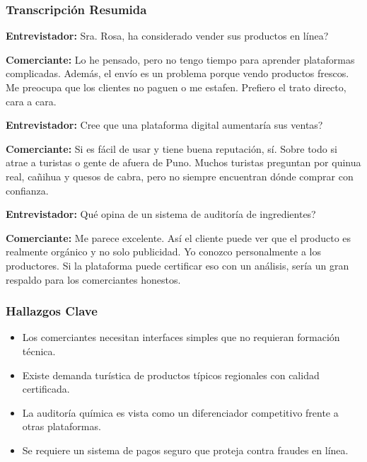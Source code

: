 \documentclass[12pt,a4paper]{article}
\begin{document}
\subsubsection{Transcripci\'on Resumida}

\textbf{Entrevistador:} Sra. Rosa, \textquestiondown ha considerado vender sus productos en l\'inea?

\textbf{Comerciante:} Lo he pensado, pero no tengo tiempo para aprender plataformas
complicadas. Adem\'as, el env\'io es un problema porque vendo productos frescos. Me
preocupa que los clientes no paguen o me estafen. Prefiero el trato directo,
cara a cara.

\textbf{Entrevistador:} \textquestiondown Cree que una plataforma digital aumentar\'ia sus ventas?

\textbf{Comerciante:} Si es f\'acil de usar y tiene buena reputaci\'on, s\'i. Sobre todo si
atrae a turistas o gente de afuera de Puno. Muchos turistas preguntan por quinua
real, ca\~nihua y quesos de cabra, pero no siempre encuentran d\'onde comprar con
confianza.

\textbf{Entrevistador:} \textquestiondown Qu\'e opina de un sistema de auditor\'ia de ingredientes?

\textbf{Comerciante:} Me parece excelente. As\'i el cliente puede ver que el producto es
realmente org\'anico y no solo publicidad. Yo conozco personalmente a los
productores. Si la plataforma puede certificar eso con un an\'alisis, ser\'ia un gran
respaldo para los comerciantes honestos.

\subsubsection{Hallazgos Clave}

\begin{itemize}[leftmargin=1.5cm]
  \item Los comerciantes necesitan interfaces simples que no requieran formaci\'on t\'ecnica.
  \item Existe demanda tur\'istica de productos t\'ipicos regionales con calidad certificada.
  \item La auditor\'ia qu\'imica es vista como un diferenciador competitivo frente a otras
    plataformas.
  \item Se requiere un sistema de pagos seguro que proteja contra fraudes en l\'inea.
\end{itemize}

\newpage

\end{document}
